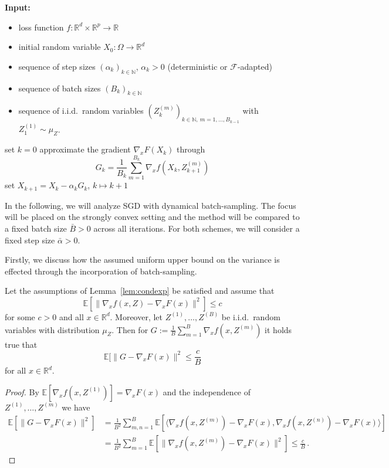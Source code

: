 \documentclass[12pt,openany]{book}
\theoremstyle{definition}
\theoremstyle{definition}
\newcommand{\E}{\mathbb{E}}
\newcommand{\N}{\mathbb{N}}
\newcommand{\R}{\mathbb{R}}
\begin{document}
\begin{algorithm}[htb!]
\begin{algorithmic}[1]
\State \textbf{Input:} \begin{itemize}
 \item loss function $f:\R^d\times \R^p\to\R$
 \item initial random variable $X_0:\Omega\to\R^d$
 \item sequence of step sizes $(\alpha_k)_{k\in\N}$, $\alpha_k>0$ (deterministic or $\mathcal F$-adapted)
 \item sequence of batch sizes $(B_k)_{k\in\N}$
 \item sequence of i.i.d.~random variables $(Z_k^{(m)})_{k\in\N,\ m=1,\dots,B_{k-1}}$ with $Z_1^{(1)}\sim\mu_Z$. 
 \end{itemize}
 \State set $k=0$
	\State approximate the gradient $\nabla_x F(X_k)$ through
	\[G_k = \frac{1}{B_{k}}\sum_{m=1}^{B_k}\nabla_x f(X_k,Z_{k+1}^{(m)}) \]
	\State set $X_{k+1} = X_k -\alpha_k G_k$, $k \mapsto k+1$
\EndWhile
\end{algorithmic}
 \caption{SGD with dynamic sampling}\label{alg:SGD_DS}
\end{algorithm}

In the following, we will analyze SGD with dynamical batch-sampling. The focus will be placed on the strongly convex setting and the method will be compared to a fixed batch size $\bar B>0$ across all iterations. For both schemes, we will consider a fixed step size $\bar \alpha>0$.

Firstly, we discuss how the assumed uniform upper bound on the variance is effected through the incorporation of batch-sampling. 
\begin{lemma}\label{lem:batching}
Let the assumptions of Lemma~\ref{lem:condexp} be satisfied and assume that
\[\E[\|\nabla_x f(x,Z) - \nabla_x F(x)\|^2]\le c \]
for some $c>0$ and all $x\in\R^d$. Moreover, let $Z^{(1)},\dots, Z^{(B)}$ be i.i.d.~random variables with distribution $\mu_Z$. Then for $G:=\frac{1}{B}\sum_{m=1}^B\nabla_x f(x,Z^{(m)})$ it holds true that
\[ \E[\|G-\nabla_x F(x)\|^2 \le \frac{c}{B} \]
for all $x\in\R^d$. 
\end{lemma}
\begin{proof}
By $\E[\nabla_x f(x,Z^{(1)})] = \nabla_x F(x)$ and the independence of $Z^{(1)},\dots,Z^{(m)}$ we have
\begin{align*}
\E[\|G-\nabla_x F(x) \|^2] &= \frac1{B^2}\sum_{m,n=1}^B\E[\langle \nabla_x f(x,Z^{(m)}) - \nabla_x F(x) , \nabla_x f(x,Z^{(n)}) - \nabla_x F(x)\rangle ]\\ &= \frac{1}{B^2} \sum_{m=1}^B \E[\|\nabla_x f(x,Z^{(m)})- \nabla_x F(x)\|^2] \le \frac{c}{B}\,.
\end{align*}
\end{proof}
\end{document}
